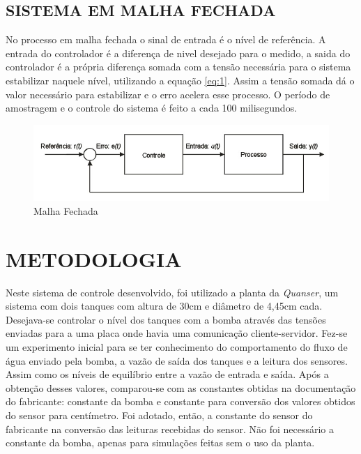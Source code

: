 \documentclass[a4paper,12pt]{article}
\begin{document}
\subsection{SISTEMA EM MALHA FECHADA}
\hspace{4ex}No processo em malha fechada o sinal de entrada é o nível de referência.
A entrada do controlador é a diferença de nivel desejado para o medido, a saida do controlador é a própria diferença somada com a tensão necessária para o sistema estabilizar naquele nível, utilizando a equação \ref{eq:1}.
Assim a tensão somada dá o valor necessário para estabilizar e o erro acelera esse processo.
O período de amostragem e o controle do sistema é feito a cada 100 milisegundos.


\begin{figure}[H]
\includegraphics[width=15cm]{malhaFechada.jpg}
\caption{Malha Fechada}
\label{fig:malhaFechada}
\end{figure}


\newpage


\thispagestyle{main}

\section{METODOLOGIA}


\hspace{4ex}Neste sistema de controle desenvolvido, foi utilizado a planta da \textit{Quanser}, um sistema com dois tanques com altura de 30cm e diâmetro de 4,45cm cada. Desejava-se controlar o nível dos tanques com a bomba através das tensões enviadas para a uma placa onde havia uma comunicação cliente-servidor. Fez-se um experimento inicial para se ter conhecimento do comportamento do fluxo de água enviado pela bomba, a vazão de saída dos tanques e a leitura dos sensores. Assim como os níveis de equilíbrio entre a vazão de entrada e saída. Após a obtenção desses valores, comparou-se com as constantes obtidas na documentação do fabricante: constante da bomba e constante para conversão dos valores obtidos do sensor para centímetro. Foi adotado, então, a constante do  sensor do fabricante na conversão das leituras recebidas do sensor. Não foi necessário a constante da bomba, apenas para simulações feitas sem o uso da planta.
\end{document}
